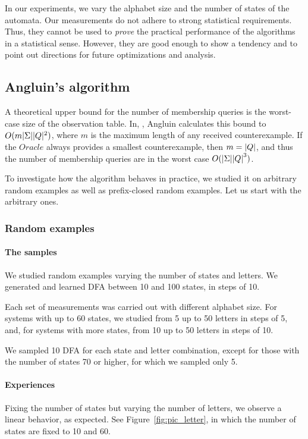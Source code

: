 In our experiments, we vary the alphabet size and the number of states
of the automata. Our measurements do not adhere to strong statistical
requirements. Thus, they cannot be used to \emph{prove} the practical
performance of the algorithms in a statistical sense. However, they
are good enough to show a tendency and to point out directions for
future optimizations and analysis.


\subsection{Angluin's algorithm}

A theoretical upper bound for the number of membership queries is the
worst-case size of the observation table. In, 
\cite{Angluin:regset}, Angluin calculates this bound to
$O(m|\Sigma||Q|^2)$, where $m$ is the maximum length of any
received counterexample. If the $Oracle$ always provides a smallest
counterexample, then $m = |Q|$, and thus the number of
membership queries are in the worst case $O(|\Sigma|{|Q|}^3)$.

To investigate how the algorithm behaves in practice, we studied it on
arbitrary random examples as well as prefix-closed random
examples. Let us start with the arbitrary ones.

\subsubsection{Random examples}

\paragraph{The samples}
We studied random examples varying the number of states and letters.
We generated and learned DFA between 10 and 100 states, in steps of 10. 

Each set of measurements was carried out with different alphabet size.
For systems with up to 60 states, we studied from 5 up to 50 letters
in steps of 5, and, for systems with more states, from 10 up to 50
letters in steps of 10.

We sampled 10 DFA for each state and letter combination, except for
those with the number of states 70 or higher, for which we sampled
only 5.

\paragraph{Experiences}
Fixing the number of states but varying the number of letters, we
observe a linear behavior, as expected. See
Figure~\ref{fig:pic_letter}, in which the number of states are fixed
to 10 and 60.

